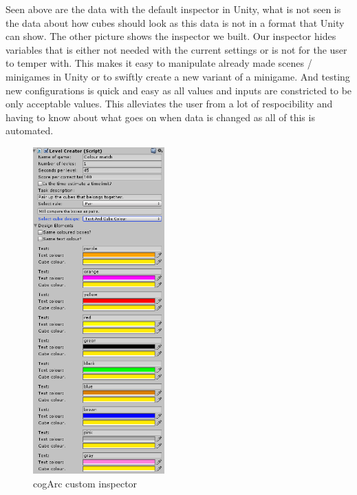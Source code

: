 Seen above are the data with the default inspector in Unity, what is not seen is the data about how cubes should look as this data 
is not in a format that Unity can show.
The other picture shows the inspector we built. 
Our inspector hides variables that is either not needed with the current settings or is not for the user to temper with.
This makes it easy to manipulate already made scenes / minigames in Unity or to swiftly create a new variant of a minigame.
And testing new configurations is quick and easy as all values and inputs are constricted to be only acceptable values.
This alleviates the user from a lot of respocibility and having to know about what goes on when data is changed as all of this is automated.

\begin{figure}
	\capstart
	\vspace{-30pt}
	\includegraphics[width=0.45\textwidth]{images/inspector_edited.png}
	\caption{cogArc custom inspector}
	\label{fig:inspector_edited}
	\vspace{-15pt}
\end{figure}
